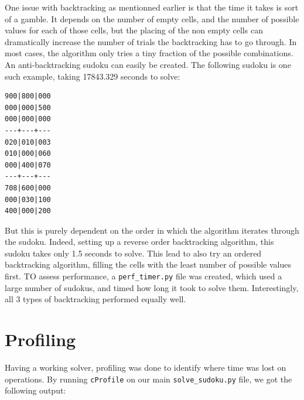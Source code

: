 \documentclass[12pt]{report} %
\begin{document}
One issue with backtracking as mentionned earlier is that the time it takes is sort of a gamble. It depends on the number of empty cells, and the number of possible values for each of those cells, but the placing of the non empty cells can dramatically increase the number of trials the backtracking has to go through. In most cases, the algorithm only tries a tiny fraction of the possible combinations. An anti-backtracking sudoku can easily be created\cite{stackoverflow_optimizing_backtracking_sudoku}. The following sudoku is one such example, taking 17843.329 seconds to solve:

\begin{lstlisting}[caption={anti\_backtracking.txt sudoku}]
900|800|000
000|000|500
000|000|000
---+---+---
020|010|003
010|000|060
000|400|070
---+---+---
708|600|000
000|030|100
400|000|200
\end{lstlisting}

But this is purely dependent on the order in which the algorithm iterates through the sudoku. Indeed, setting up a reverse order backtracking algorithm, this sudoku takes only 1.5 seconds to solve. This lead to also try an ordered backtracking algorithm, filling the cells with the least number of possible values first\cite{stackoverflow_optimizing_backtracking_sudoku}. TO assess performance, a \texttt{perf\_timer.py} file was created, which used a large number of sudokus, and timed how long it took to solve them. Interestingly, all 3 types of backtracking performed equally well. 
 
\section{Profiling}



Having a working solver, profiling was done to identify where time was lost on operations. By running \texttt{cProfile} on our main \texttt{solve\_sudoku.py} file, we got the following output:
\end{document}
